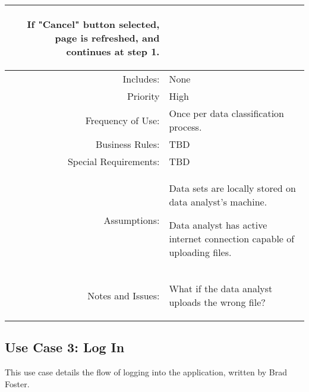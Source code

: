 \documentclass[12pt,oneside,letterpaper]{article}
\newenvironment{packed_enumerate}{ %
\vspace{-7mm}
\begin{enumerate}
  \setlength{\itemsep}{0pt}
  \setlength{\parskip}{0pt}
  \setlength{\parsep}{0pt}
}{\end{enumerate}
\vspace{-8mm}}
\begin{document}
\begin{longtable}{|r|p{3.8in}|}
\begin{packed_enumerate}
\item If "Cancel" button selected, page is refreshed, and continues at step 1.
\end{packed_enumerate}\\
\hline
Includes:&None\\
\hline
Priority&High\\
\hline
Frequency of Use:&Once per data classification process.\\
\hline
Business Rules:&TBD\\
\hline
Special Requirements:&TBD\\
\hline
Assumptions:&\begin{packed_enumerate}
\item Data sets are locally stored on data analyst's machine.
\item Data analyst has active internet connection capable of uploading files.
\end{packed_enumerate}\\
\hline
Notes and Issues:&\begin{packed_enumerate}
\item What if the data analyst uploads the wrong file?
\end{packed_enumerate}\\
\hline
\end{longtable}

\subsection{\label{Log In}Use Case 3: Log In}
This use case details the flow of logging into the application, written by Brad Foster.
\end{document}

